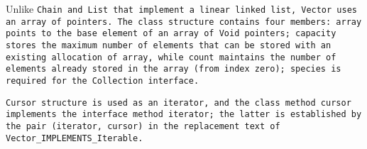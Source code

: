 
Unlike \tt{Chain} and \tt{List} that implement a linear linked list,
\tt{Vector} uses an array of pointers.
The class structure contains four members: \tt{array} points to the base element
of an array of \tt{Void} pointers; \tt{capacity} stores the maximum number
of elements that can be stored with an existing allocation of \tt{array},
while \tt{count} maintains the number of elements already stored in the array
(from index zero); \tt{species} is required for the \tt{Collection} interface.

\tt{Cursor} structure is used as an iterator, and the class
method \tt{cursor} implements the interface method \tt{iterator};
the latter is established by the pair \tt{(iterator, cursor)}
in the replacement text of \tt{Vector_IMPLEMENTS_Iterable}.
